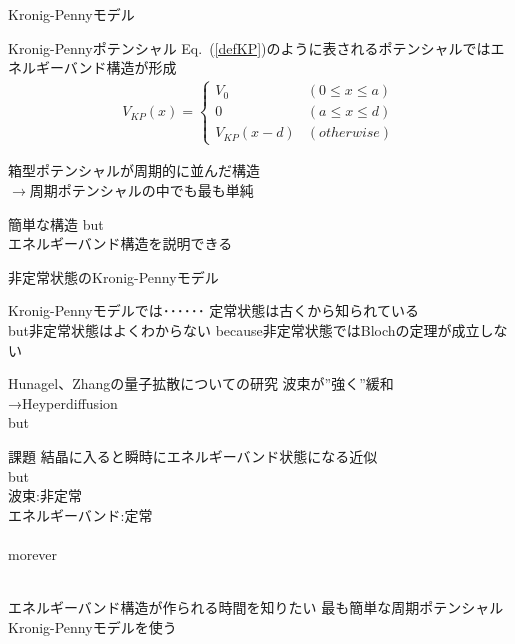 \documentclass[unicode, 12pt, aspectratio=169]{beamer}
\newcommand{\eref}[1]{Eq.~(\ref{#1})}
\begin{document}
\begin{frame}{Kronig-Pennyモデル}
  \begin{block}{Kronig-Pennyポテンシャル}
    \eref{defKP}のように表されるポテンシャルではエネルギーバンド構造が形成
    \begin{align}
        V_{KP}(x) =
        \begin{cases}
          V_0  & (0 \leq x \leq a)\\
          0    & (a \leq x \leq d)\\
          V_{KP}(x - d) & (otherwise)
        \end{cases}\label{defKP}
      \end{align}
    \end{block}
   箱型ポテンシャルが周期的に並んだ構造\\
   $\rightarrow$周期ポテンシャルの中でも最も単純
    \begin{block}{簡単な構造}
    \alert{but}\\
    エネルギーバンド構造を説明できる
    \end{block}
\end{frame}

\begin{frame}{非定常状態のKronig-Pennyモデル}
  \begin{block}{Kronig-Pennyモデルでは･･････}
    定常状態は古くから知られている\\
      \alert{but}非定常状態はよくわからない
      \alert{because}非定常状態ではBlochの定理が成立しない
  \end{block}

  \begin{block}{Hunagel、Zhangの量子拡散についての研究}
      波束が”強く”緩和\\
      →Heyperdiffusion\\
      \alert{but}\\
  \end{block}
\end{frame}

 \begin{frame}{課題}
    結晶に入ると瞬時にエネルギーバンド状態になる近似\\
    \alert{but}\\
    波束:非定常\\
    エネルギーバンド:定常\\
    \\
    \alert{morever}\\
    \\
    \begin{alertblock}{エネルギーバンド構造が作られる時間を知りたい}
    最も簡単な周期ポテンシャル\rightarrow Kronig-Pennyモデルを使う
    \end{alertblock}
\end{frame}
\end{document}
